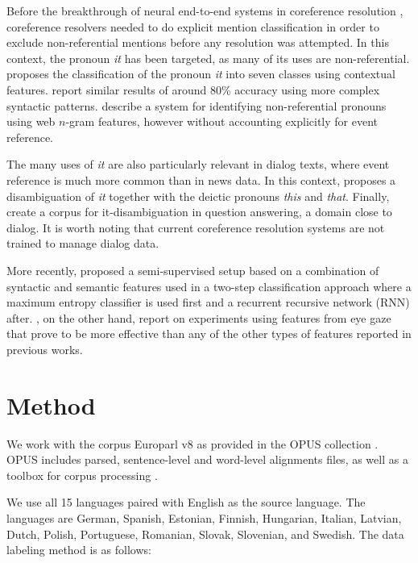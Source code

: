 \documentclass[10pt, a4paper]{article}
\begin{document}
%
% 
Before the breakthrough of neural end-to-end systems in coreference resolution
\cite{Lee:2017}, coreference resolvers needed to do explicit mention
classification in order to exclude non-referential mentions before any
resolution was attempted. In this context, the pronoun \textit{it} has been targeted,
as many of its uses are non-referential.  proposes the
classification of the pronoun \textit{it} into seven classes using contextual features.
 report similar results of around 80\% accuracy using more
complex syntactic patterns.  describe a system for
identifying non-referential pronouns using web $n$-gram features, however
without accounting explicitly for event reference.

The many uses of \textit{it} are also particularly relevant in dialog texts, where
event reference is much more common than in news data. In this context,
 proposes a disambiguation of \textit{it} together with
the deictic pronouns \textit{this} and \textit{that}.  Finally,  create a corpus
for it-disambiguation in question answering, a domain close to dialog. It is
worth noting that current coreference resolution systems are not trained to
manage dialog data.

More recently,   proposed a semi-supervised setup
based on a combination of syntactic and semantic features used in a two-step
classification approach where a maximum entropy classifier is used first and a
recurrent recursive network (RNN) after. ,
on the other hand, report on experiments using features from eye gaze that prove
to be more effective than any of the other types of features reported in
previous works.




\section{Method}

We work with the corpus Europarl \cite{Koehn2005} v8 as provided in the OPUS 
collection \cite{TIEDEMANN12.463}. OPUS includes parsed, sentence-level 
and word-level alignments files, as well as a toolbox for corpus processing 
\cite{aulamo-et-al-opus}. 

We use all 15 languages paired with English as the 
source language. The languages are German, Spanish, Estonian, Finnish, 
Hungarian, Italian, Latvian, Dutch, Polish, Portuguese, Romanian, Slovak, 
Slovenian, and Swedish. The data labeling method is as follows:
\end{document}

